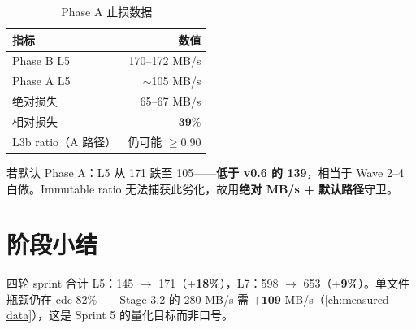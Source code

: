 \begin{table}[htbp]
\centering
\caption{Phase A 止损数据}
\begin{tabular}{@{}lr@{}}
\toprule
指标 & 数值 \\
\midrule
Phase B L5 & 170--172 MB/s \\
Phase A L5 & $\sim$105 MB/s \\
绝对损失 & 65--67 MB/s \\
相对损失 & $\mathbf{-39\%}$ \\
L3b ratio（A 路径） & 仍可能 $\geq$0.90 \\
\bottomrule
\end{tabular}
\end{table}

\begin{prunebox}[量化止损条件]
若默认 Phase A：L5 从 171 跌至 105——\textbf{低于 v0.6 的 139}，相当于 Wave 2--4 白做。Immutable ratio 无法捕获此劣化，故用\textbf{绝对 MB/s + 默认路径}守卫。
\end{prunebox}

\section{阶段小结}

 四轮 sprint 合计 L5：145 $\rightarrow$ 171（+\textbf{18\%}），L7：598 $\rightarrow$ 653（+\textbf{9\%}）。单文件瓶颈仍在 cdc 82\%——Stage 3.2 的 280 MB/s 需 $\mathbf{+109}$ MB/s（\cref{ch:measured-data}），这是 Sprint 5 的量化目标而非口号。
